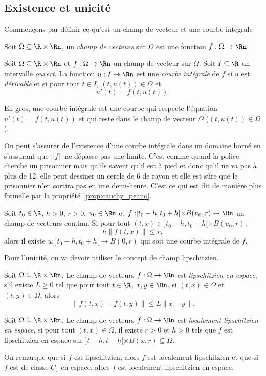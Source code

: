 \subsection{Existence et unicité}
Commençons par définir ce qu'est un champ de vecteur et
une courbe intégrale
\begin{mydef}
  Soit $\Omega \subseteq \R \times \Rn$,
  un \emph{champ de vecteurs} sur $\Omega$ est une fonction
  $f:\Omega \to \Rn$.
\end{mydef}
\begin{mydef}
  Soit $\Omega \subseteq \R \times \Rn$ et $f:\Omega\to\Rn$
  un champ de vecteur sur $\Omega$.
  Soit $I \subseteq \R$ un intervalle \emph{ouvert}.
  La fonction $u:I\to\Rn$ est une \emph{courbe intégrale} de $f$ si $u$
  est \emph{dérivable} et si pour tout $t\in I$, $(t, u(t)) \in \Omega$ et
  \[ u'(t) = f(t, u(t)). \]
\end{mydef}
En gros, une courbe intégrale est une courbe qui respecte l'équation
$u'(t) = f(t, u(t))$ et qui reste dans le champ de vecteur $\Omega$
($(t, u(t)) \in \Omega$).

On peut s'assurer de l'existence d'une courbe intégrale dans un domaine
borné en s'assurant que $||f||$ ne dépasse pas une limite.
C'est comme quand la police cherche un prisonnier mais qu'ils savent
qu'il est à pied et donc qu'il ne va pas à plus de
\si{12}{\kilo\meter\per\hour}, elle peut dessiner un cercle de
\si{6}{\kilo\meter} de rayon
et elle est sûre que le prisonnier n'en sortira pas en
une demi-heure.
C'est ce qui est dit de manière plus formelle par
la propriété~\ref{prop:cauchy_peano}.
\begin{myprop}
  \label{prop:cauchy_peano}
  Soit $t_0 \in \R$, $h > 0$, $r > 0$,
  $u_0 \in \Rn$ et $f:]t_0-h,t_0+h[\times B(u_0,r)\to\Rn$ un champ de vecteurs
  continu.
  Si pour tout $(t,x) \in ]t_0-h,t_0+h[ \times B(u_0,r)$,
  \[ h\|f(t,x)\| \leq r, \]
  alors il existe $u:]t_0-h,t_0+h[ \to B(0,r)$
  qui soit une courbe intégrale de $f$.
\end{myprop}

Pour l'unicité, on va devoir utiliser le concept de champ lipschitzien.
\begin{mydef}
  Soit $\Omega \subseteq \R \times \Rn$.
  Le champ de vecteurs $f:\Omega\to\Rn$ est \emph{lipschitzien
  en espace}, s'il existe $L \geq 0$ tel que pour tout
  $t\in\R$, $x,y\in\Rn$, si $(t,x) \in \Omega$ et $(t,y) \in \Omega$, alors
  \[ \|f(t,x) - f(t,y)\| \leq L \|x - y\|. \]
\end{mydef}
\begin{mydef}
  Soit $\Omega \subseteq \R \times \Rn$.
  Le champ de vecteurs $f:\Omega\to\Rn$ est \emph{localement lipschitzien
  en espace}, si pour tout
  $(t,x) \in \Omega$,
  il existe $r > 0$ et $h > 0$ tels que
  $f$ est lipschitzien en espace sur
  $]t-h,t+h[ \times B(x,r) \subseteq \Omega$.
\end{mydef}
On remarque que si $f$ est lipschitzien, alors $f$ est localement lipschitzien
et que si $f$ est de classe $C_1$ en espace, alors $f$ est localement
lipschitzien en espace.

